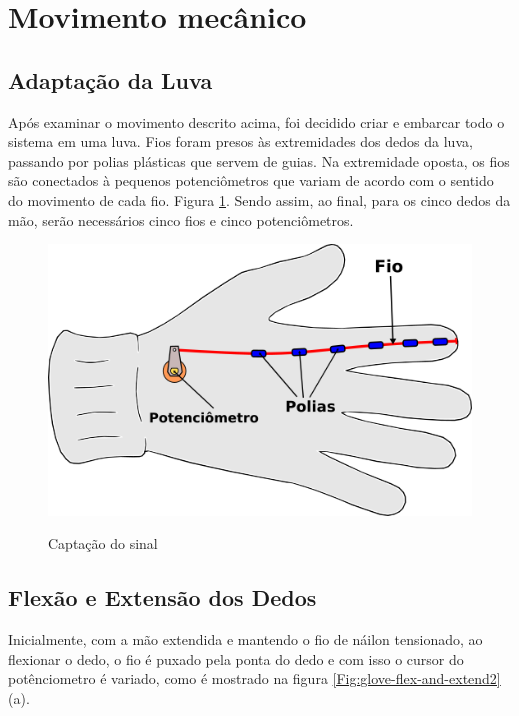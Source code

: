 \documentclass[
	12pt,				%
	openright,			%
	oneside,			%
	a4paper,			%
	english,			%
	brazil				%
	]{abntex2}
\begin{document}

		\section{Movimento mecânico}
		\subsection{Adaptação da Luva}

			Após examinar o movimento descrito acima, foi decidido criar e embarcar todo o sistema em uma luva. Fios foram presos às extremidades dos dedos da luva, passando por polias plásticas que servem de guias. Na extremidade oposta, os fios são conectados à pequenos potenciômetros que variam de acordo com o sentido do movimento de cada fio. Figura \ref{Fig:glove-and-transmitter1}. Sendo assim, ao final, para os cinco dedos da mão, serão necessários cinco fios e cinco potenciômetros.


		\begin{figure}[h!]
			\centering
			\caption{Captação do sinal}
  		\includegraphics[scale=0.7]{./figures/glove-wire-pot1.png}
  		\label{Fig:glove-and-transmitter1}
		\end{figure}


		\subsection{Flexão e Extensão dos Dedos}

		Inicialmente, com a mão extendida e mantendo o fio de náilon tensionado, ao flexionar o dedo, o fio é puxado pela ponta do dedo e com isso o cursor do potênciometro é variado, como é mostrado na figura \ref{Fig:glove-flex-and-extend2} (a).
\end{document}
